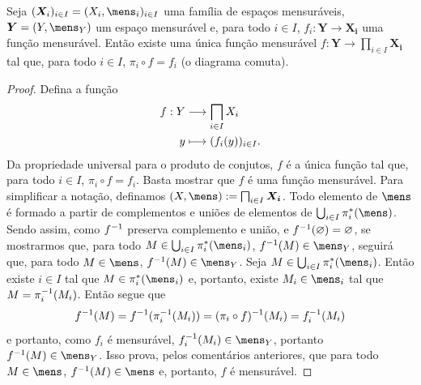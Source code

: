 \begin{prop}
Seja $(\bm X_i)_{i \in I} = (X_i,\mens_i)_{i \in I}$ uma família de espaços mensuráveis, $\bm Y = (Y,\mens_Y)$ um espaço mensurável e, para todo $i \in I$, $f_i: \bm Y \to \bm{X_i}$ uma função mensurável. Então existe uma única função mensurável $f: \bm Y \to \prod_{i \in I} \bm{X_i}$ tal que, para todo $i \in I$, $\pi_i \circ f = f_i$ (o diagrama comuta).
\begin{figure}
\centering
{}
\end{figure}
\end{prop}
\begin{proof}
Defina a função
	\begin{align*}
	\func{f}{Y}{\prod_{i \in I} X_i}{y}{(f_i(y))_{i \in I}}.
	\end{align*}
Da propriedade universal para o produto de conjutos, $f$ é a única função tal que, para todo $i \in I$, $\pi_i \circ f = f_i$. Basta mostrar que $f$ é uma função mensurável. Para simplificar a notação, definamos $(X,\mens) := \prod_{i \in I} \bm{X_i}$. Todo elemento de $\mens$ é formado a partir de complementos e uniões de elementos de $\bigcup_{i \in I} \pi_i^*(\mens)$. Sendo assim, como $f^{-1}$ preserva complemento e união, e $f^{-1}(\varnothing)=\varnothing$, se mostrarmos que, para todo $M \in \bigcup_{i \in I} \pi_i^*(\mens_i)$, $f\inv(M) \in \mens_Y$, seguirá que, para todo $M \in \mens$, $f\inv(M) \in \mens_Y$. Seja $M \in \bigcup_{i \in I} \pi_i^*(\mens_i)$. Então existe $i \in I$ tal que $M \in \pi_i^*(\mens_i)$ e, portanto, existe $M_i \in \mens_i$ tal que $M=\pi_i^{-1}(M_i)$. Então segue que
	\begin{equation*}
	f^{-1}(M) = f^{-1}(\pi_i^{-1}(M_i)) = (\pi_i \circ f)^{-1}(M_i) = f_i^{-1}(M_i)
	\end{equation*}
e portanto, como $f_i$ é mensurável, $f_i\inv(M_i) \in \mens_Y$, portanto $f\inv(M) \in \mens_Y$. Isso prova, pelos comentários anteriores, que para todo $M \in \mens$, $f\inv(M) \in \mens$ e, portanto, $f$ é mensurável.
\end{proof}







